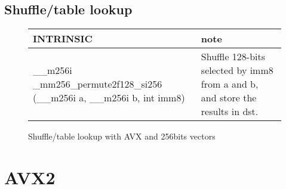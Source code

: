 \documentclass{article}
\begin{document}
\subsection{Shuffle/table lookup}
\vspace{1cm}
\begin{figure}[h!]
\noindent
\noindent\begin{tabular}{|l|l|}
  \hline
  INTRINSIC & note \\
  \hline
  \_\_m256i \_mm256\_permute2f128\_si256 (\_\_m256i a, \_\_m256i b, int imm8) &Shuffle 128-bits selected by imm8 from a and b, and store the results in dst.
 \\
    \hline
\end{tabular}
\caption{Shuffle/table lookup with AVX and 256bits vectors}
\label{fig:Shuffle/table lookup AVX 256bits instructions}
\end{figure}

\newpage
\section{AVX2}
\end{document}
